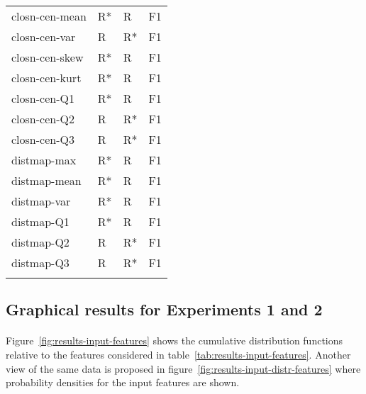 \begin{longtable}{llll}
		closn-cen-mean                &     R* &    R &    F1 \\
		closn-cen-var                 &      R &   R* &    F1 \\
		closn-cen-skew                &     R* &    R &    F1 \\
		closn-cen-kurt                &     R* &    R &    F1 \\
		closn-cen-Q1                  &     R* &    R &    F1 \\
		closn-cen-Q2                  &      R &   R* &    F1 \\
		closn-cen-Q3                  &      R &   R* &    F1 \\
		distmap-max                   &     R* &    R &    F1 \\
		distmap-mean                  &     R* &    R &    F1 \\
		distmap-var                   &     R* &    R &    F1 \\
		distmap-Q1                    &     R* &    R &    F1 \\
		distmap-Q2                    &      R &   R* &    F1 \\
		distmap-Q3                    &      R &   R* &    F1 \\
		\label{tab:results-other-features}
	\end{longtable}

\subsection{Graphical results for Experiments 1 and 2}
\paragraph{} Figure~\ref{fig:results-input-features} shows the cumulative distribution functions relative to the features considered in table~\ref{tab:results-input-features}. Another view of the same data is proposed in figure~\ref{fig:results-input-distr-features} where probability densities for the input features are shown.

